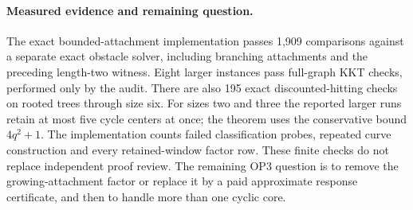 \paragraph{Measured evidence and remaining question.}
The exact bounded-attachment implementation passes 1,909
comparisons against a separate exact obstacle solver, including branching
attachments and the preceding length-two witness. Eight larger instances
pass full-graph KKT checks, performed only by the audit. There are also
195 exact discounted-hitting checks on rooted trees through size six.
For sizes two and three the reported larger runs retain at most five cycle
centers at once; the theorem uses the conservative bound $4q^2+1$.
The implementation counts failed classification probes, repeated curve
construction and every retained-window factor row. These finite checks do
not replace independent proof review. The remaining OP3 question is to
remove the growing-attachment factor or replace it by a paid approximate
response certificate, and then to handle more than one cyclic core.
